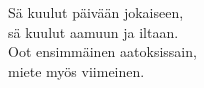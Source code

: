 
        Sä kuulut päivään jokaiseen, \\
        sä kuulut aamuun ja iltaan. \\
        Oot ensimmäinen aatoksissain, \\
        miete myös viimeinen. \\
